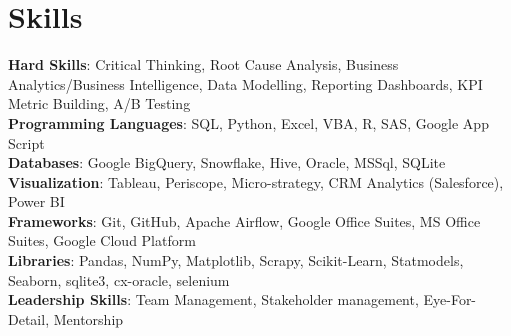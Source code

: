 \section{Skills}
  \begin{itemize}[leftmargin=0.1in, label={}]
    \normalsize{\item{
      \textbf{Hard Skills}: Critical Thinking, Root Cause Analysis, Business Analytics/Business Intelligence, Data Modelling, Reporting Dashboards, KPI Metric Building, A/B Testing \\
      \textbf{Programming Languages}: SQL, Python, Excel, VBA, R, SAS, Google App Script \\
      \textbf{Databases}: Google BigQuery, Snowflake, Hive, Oracle, MSSql, SQLite \\
      \textbf{Visualization}: Tableau, Periscope, Micro-strategy, CRM Analytics (Salesforce), Power BI \\
      \textbf{Frameworks}: Git, GitHub, Apache Airflow, Google Office Suites, MS Office Suites, Google Cloud Platform \\
      \textbf{Libraries}: Pandas, NumPy, Matplotlib, Scrapy, Scikit-Learn, Statmodels, Seaborn, sqlite3, cx-oracle, selenium \\
      \textbf{Leadership Skills}: Team Management, Stakeholder management, Eye-For-Detail, Mentorship \\
     }}
  \end{itemize}
\vspace{-18pt}